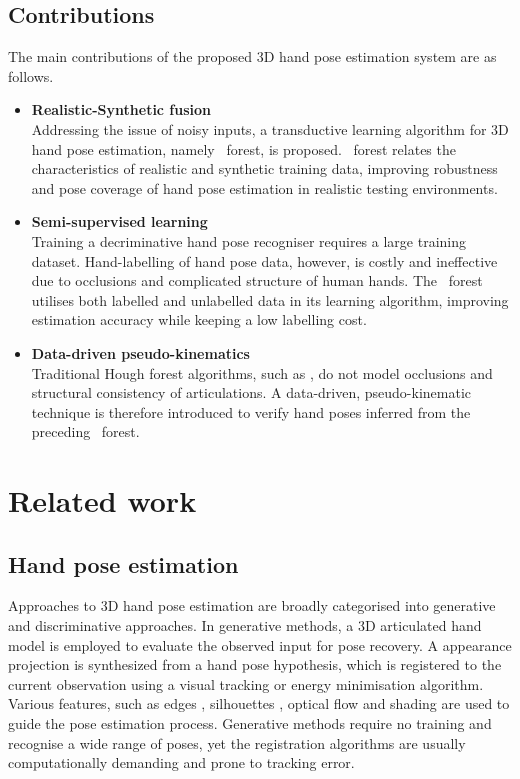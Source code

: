 \subsection{Contributions} 
The main contributions of the proposed 3D hand pose estimation system are as follows. 

\begin{itemize}
\item{\textbf{Realistic-Synthetic fusion}}\\
Addressing the issue of noisy inputs, a transductive learning algorithm for 3D hand pose estimation, namely \STR\ forest, is proposed. \STR\ forest relates the characteristics of realistic and synthetic training data, improving robustness and pose coverage of hand pose estimation in realistic testing environments.
\item{\textbf{Semi-supervised learning}}\\
Training a decriminative hand pose recogniser requires a large training dataset. Hand-labelling of hand pose data, however, is costly and ineffective due to occlusions and complicated structure of human hands. 
The \STR\ forest utilises both labelled and unlabelled data in its learning algorithm, improving estimation accuracy while keeping a low labelling cost. 
\item{\textbf{Data-driven pseudo-kinematics}}\\
Traditional Hough forest algorithms, such as \cite{Gall2009}, do not model occlusions and structural consistency of articulations. A data-driven, pseudo-kinematic technique is therefore introduced to verify hand poses inferred from the preceding \STR\ forest.  
\end{itemize} 

\section{Related work}

\subsection{Hand pose estimation}

Approaches to 3D hand pose estimation are broadly categorised into generative and discriminative approaches. In generative methods, a 3D articulated hand model is employed to evaluate the observed input for pose recovery. A appearance projection is synthesized from a hand pose hypothesis, which is registered to the current observation using a visual tracking or energy minimisation algorithm. Various features, such as edges \cite{Guan2006}, silhouettes \cite{Wu2000}, optical flow \cite{Lu2003} and shading \cite{LaGorce2011} are used to guide the pose estimation process. Generative methods require no training and recognise a wide range of poses, yet the registration algorithms are usually computationally demanding and prone to tracking error.


